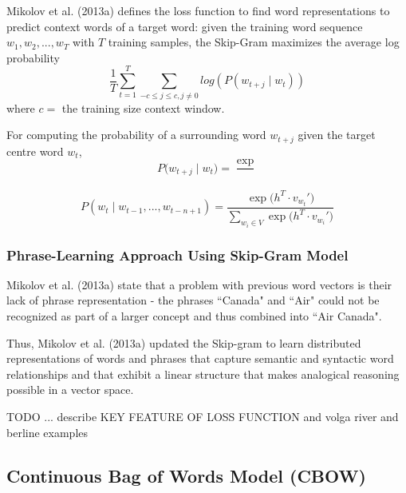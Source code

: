 Mikolov et al. (2013a) defines the loss function to find word representations to predict context words of a target word: given the training word sequence $w_1, w_2, ..., w_T$ with $T$ training samples, the Skip-Gram maximizes the average log probability
$$
\frac{1}{T} \sum_{t=1}^T \sum_{-c \leq j \leq c, j \neq 0} log (P(w_{t+j} \;| \; w_t))
$$
where $c =$ the training size context window. 

For computing the probability of a surrounding word $w_{t+j}$ given the target centre word $w_t$,
$$
P \Big(w_{t+j} \; | \; w_t \Big) = \frac{ \exp{} } {}
$$

$$
P(w_t \; | \; w_{t-1}, ..., w_{t-n+1}) = \frac {\exp{ \Big(h^T \cdot v_{w_t}' \Big) }} {\sum_{w_i \in V} \exp{ \Big(h^T \cdot v_{w_i}' \Big) }}
$$










\subsubsection{Phrase-Learning Approach Using Skip-Gram Model}

Mikolov et al. (2013a) state that a problem with previous word vectors is their lack of phrase representation - the phrases ``Canada" and ``Air" could not be recognized as part of a larger concept and thus combined into ``Air Canada". 

Thus, Mikolov et al. (2013a) updated the Skip-gram to learn distributed representations of words and phrases that capture semantic and syntactic word relationships and that exhibit a linear structure that makes analogical reasoning possible in a vector space. 

TODO ... describe KEY FEATURE OF LOSS FUNCTION and volga river and berline examples

\subsection{Continuous Bag of Words Model (CBOW)}